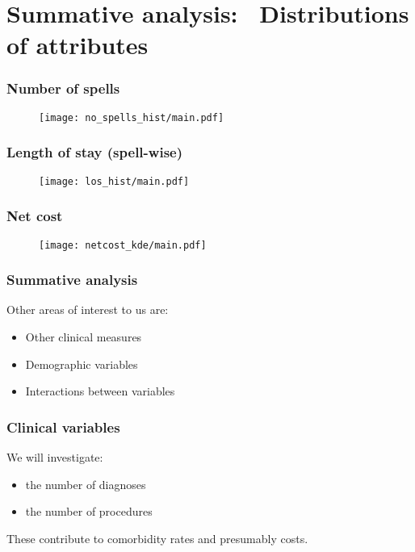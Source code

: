 \section{Summative analysis:%
         \ Distributions of attributes}

\begin{frame}
    \frametitle{Number of spells}

    \begin{figure}
    \texttt{[image: no\_spells\_hist/main.pdf]}
    \end{figure}
\end{frame}

\begin{frame}
    \frametitle{Length of stay (spell-wise)}

    \begin{figure}
    \texttt{[image: los\_hist/main.pdf]}
    \end{figure}
\end{frame}

\begin{frame}
    \frametitle{Net cost}

    \begin{figure}
    \texttt{[image: netcost\_kde/main.pdf]}
    \end{figure}
\end{frame}

\begin{frame}
    \frametitle{Summative analysis}
    Other areas of interest to us are:
    \begin{itemize}
        \item Other clinical measures
        \item Demographic variables
        \item Interactions between variables
    \end{itemize}
\end{frame}

\begin{frame}
    \frametitle{Clinical variables}

    We will investigate:
    \begin{itemize}
        \item the number of diagnoses
        \item the number of procedures
    \end{itemize}

    \pause%
    These contribute to comorbidity rates and presumably costs.
\end{frame}


